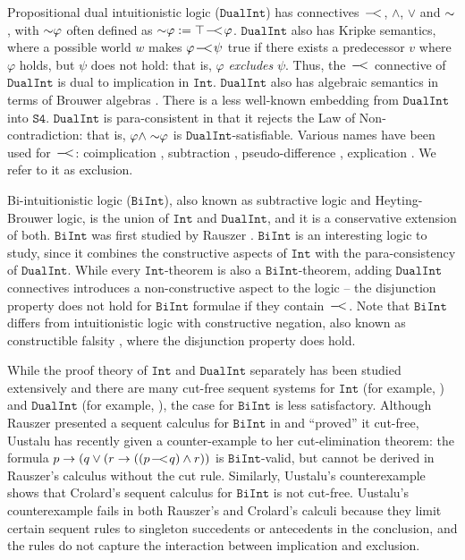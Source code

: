 \documentclass{llncs}
\numberwithin{equation}{section}
\newcommand{\Lg}[1]{\mathtt{#1}}
\newcommand{\ExAnd}{\wedge}
\newcommand{\ExOr}{\vee}
\newcommand{\ExImp}{\rightarrow}
\newcommand{\WeakImp}{
\begin{picture}(10,10)
     \put(1,0){$-$}
     \put(7,0){$<$}
   \end{picture}
   \;\; 
}
\newcommand{\WeakNot}{\sim \hspace{-0.1cm}}
\newcommand{\Top}{\top}
\newcommand {\BiInt}{
        \Lg{BiInt}
}
\newcommand {\Int}{
        \Lg{Int}
}
\newcommand {\DualInt}{
        \Lg{DualInt}
}
\newcommand {\SFour}{
        \Lg{S4}
}
\begin{document}
Propositional dual intuitionistic logic ($\DualInt$) has connectives $\WeakImp$, $\ExAnd$, $\ExOr$ and $\WeakNot \ $, with $\WeakNot \varphi$ often defined as $\WeakNot \varphi := \Top \WeakImp \varphi$. $\DualInt$ also has Kripke semantics, where a possible world $w$ makes $\varphi \WeakImp \psi$ true if there exists a predecessor $v$ where $\varphi$ holds, but $\psi$ does not hold: that is, $\varphi$ \textit{excludes} $\psi$. Thus, the $\WeakImp$ connective of $\DualInt$ is dual to implication in $\Int$. $\DualInt$ also has algebraic semantics in terms of Brouwer algebras \cite{mckinsey1946}. There is a less well-known embedding from $\DualInt$ into $\SFour$. $\DualInt$ is para-consistent in that it rejects the Law of Non-contradiction: that is, $\varphi \ExAnd \WeakNot \varphi$ is $\DualInt$-satisfiable. Various names have been used for $\WeakImp$: coimplication \cite{wolter98,uustalu2006a}, subtraction \cite{crolard2001,crolard2004}, pseudo-difference \cite{rauszer1980}, explication \cite{rauszer1974}. We refer to it as exclusion.

Bi-intuitionistic logic ($\BiInt$), also known as subtractive logic and Heyting-Brouwer logic, is the union of $\Int$ and $\DualInt$, and it is a conservative extension of both. $\BiInt$ was first studied by Rauszer \cite{rauszer1974,rauszer1980}.
$\BiInt$ is an interesting logic to study, since it combines the constructive aspects of $\Int$ with the para-consistency of $\DualInt$.
While every $\Int$-theorem is also a $\BiInt$-theorem, adding $\DualInt$ connectives introduces a non-constructive aspect to the logic -- the disjunction property does not hold for $\BiInt$ formulae if they contain $\WeakImp$. Note that $\BiInt$ differs from intuitionistic logic with constructive negation, also known as constructible falsity \cite{nelson1949}, where the disjunction property does hold.

While the proof theory of $\Int$ and $\DualInt$ separately has been studied extensively and there are many cut-free sequent systems for $\Int$ (for example, \cite{gentzen1935,dyckhoff1992,dragalin1988}) and $\DualInt$ (for example, \cite{urbas1996,czermak1977}), the case for $\BiInt$ is less satisfactory. Although Rauszer presented a sequent calculus for $\BiInt$ in \cite{rauszer1974} and ``proved'' it cut-free, Uustalu has recently given a counter-example \cite{uustalu2004} to her cut-elimination theorem: the formula $p \ExImp (q \ExOr (r \ExImp ((p \WeakImp q) \ExAnd r))$ is $\BiInt$-valid, but cannot be derived in Rauszer's calculus without the cut rule. Similarly, Uustalu's counterexample shows that Crolard's sequent calculus \cite{crolard2001} for $\BiInt$ is not cut-free. Uustalu's counterexample fails in both Rauszer's and Crolard's calculi because they limit certain sequent rules to singleton succedents or antecedents in the conclusion, and the rules do not capture the interaction between implication and exclusion.
\end{document}
